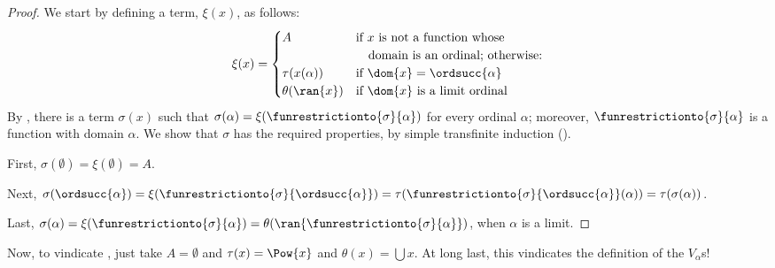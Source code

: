 \documentclass[../../../include/open-logic-section]{subfiles}
\begin{document}
\begin{proof}
We start by defining a term, $\xi(x)$, as follows: 
\[
	\xi(x) = 
	\begin{cases}
			A &\text{if $x$ is not a function whose}\\
			&\hspace{1em}\text{domain is an ordinal; otherwise:}\\
			\tau(x(\alpha)) & \text{if $\dom{x} = \ordsucc{\alpha}$}\\
			\theta(\ran{x}) & \text{if $\dom{x}$ is a limit ordinal}
	\end{cases}
\]
By , there is a term $\sigma(x)$ such that
$\sigma(\alpha) = \xi(\funrestrictionto{\sigma}{\alpha})$ for every
ordinal $\alpha$; moreover, $\funrestrictionto{\sigma}{\alpha}$ is a
function with domain $\alpha$. We show that $\sigma$ has the required
properties, by simple transfinite induction
(). 

First, $\sigma(\emptyset) = \xi(\emptyset) = A$. 

Next, $\sigma(\ordsucc{\alpha}) = \xi(\funrestrictionto{\sigma}{\ordsucc{\alpha}}) = \tau(\funrestrictionto{\sigma}{\ordsucc{\alpha}}(\alpha)) = \tau(\sigma(\alpha))$.

Last, $\sigma(\alpha) = \xi(\funrestrictionto{\sigma}{\alpha}) = \theta(\ran{\funrestrictionto{\sigma}{\alpha}})$, when $\alpha$ is a limit.
\end{proof}
\noindent
Now, to vindicate , just take $A
= \emptyset$ and $\tau(x) = \Pow{x}$ and $\theta(x) = \bigcup x$. At long last, this vindicates the definition of the $V_\alpha$s!{}
\end{document}
